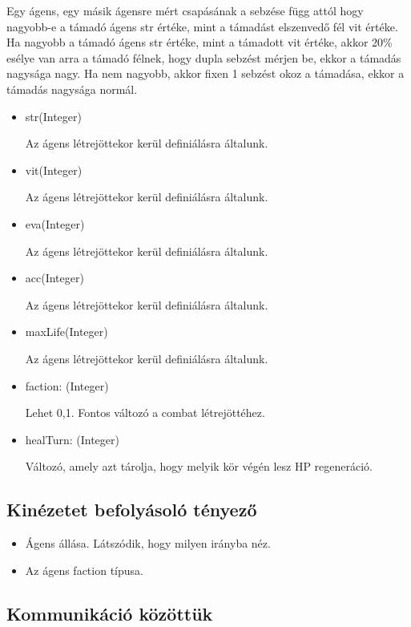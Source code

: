 Egy ágens, egy másik ágensre mért csapásának a sebzése függ attól hogy nagyobb-e a támadó ágens str értéke, mint a támadást elszenvedő fél vit értéke.
Ha nagyobb a támadó ágens str értéke, mint a támadott vit értéke, akkor 20\% esélye van arra a támadó félnek, hogy dupla sebzést mérjen be, ekkor a támadás nagysága nagy.
Ha nem nagyobb, akkor fixen 1 sebzést okoz a támadása, ekkor a támadás nagysága normál.


\begin{itemize}
    
    \item str(Integer)
    
    Az ágens létrejöttekor kerül definiálásra általunk.
    \item vit(Integer)
    
    Az ágens létrejöttekor kerül definiálásra általunk.
    \item eva(Integer)
    
    Az ágens létrejöttekor kerül definiálásra általunk.
    \item acc(Integer)
    
    Az ágens létrejöttekor kerül definiálásra általunk.
    \item maxLife(Integer)
    
    Az ágens létrejöttekor kerül definiálásra általunk.
    \item faction: (Integer)
    
    Lehet 0,1. Fontos változó a combat létrejöttéhez.
    \item healTurn: (Integer)
    
    Változó, amely azt tárolja, hogy melyik kör végén lesz HP regeneráció.
\end{itemize}

\subsection{Kinézetet befolyásoló tényező}

\begin{itemize}
    \item Ágens állása. Látszódik, hogy milyen irányba néz.
    \item Az ágens faction típusa.
\end{itemize}

\subsection{Kommunikáció közöttük}

